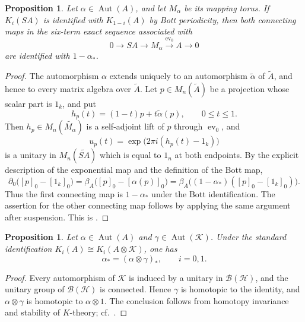 \documentclass{book}
\newtheorem{proposition}[definition]{Proposition}
\begin{document}
\begin{proposition}\label{prop:mapping-torus-connecting-maps}
  Let \(\alpha\in\operatorname{Aut}(A)\), and let \(M_\alpha\) be its mapping
  torus. If \(K_i(SA)\) is identified with \(K_{1-i}(A)\) by Bott periodicity,
  then both connecting maps in the six-term exact sequence associated with
  \[
    0\longrightarrow SA\longrightarrow M_\alpha
    \xrightarrow{\operatorname{ev}_0}A\longrightarrow0
  \]
  are identified with \(1-\alpha_*\).
\end{proposition}
\begin{proof}
  The automorphism \(\alpha\) extends uniquely to an automorphism \(\tilde{\alpha}\) of \(\tilde{A}\), and hence to every
  matrix algebra over \(\tilde{A}\). Let \(p\in M_n(\tilde{A})\) be a projection whose
  scalar part is \(1_k\), and put
  \[
    h_p(t)=(1-t)p+t\tilde{\alpha}(p),\qquad 0\leq t\leq1.
  \]
  Then \(h_p\in M_n(\widetilde{M_\alpha})\) is a self-adjoint lift of \(p\) through
  \(\operatorname{ev}_0\), and
  \[
    u_p(t)=\exp\bigl(2\pi i(h_p(t)-1_k)\bigr)
  \]
  is a unitary in \(M_n(\widetilde{SA})\) which is equal to \(1_n\) at both endpoints.
  By the explicit description of the exponential map and the definition of the
  Bott map,
  \[
    \partial_0\bigl({[p]}_0-{[1_k]}_0\bigr)
    =
    \beta_A\bigl({[p]}_0-{[\alpha(p)]}_0\bigr)
    =
    \beta_A\bigl((1-\alpha_*)({[p]}_0-{[1_k]}_0)\bigr).
  \]
  Thus the first connecting map is \(1-\alpha_*\) under the Bott
  identification. The assertion for the other connecting map follows by
  applying the same argument after suspension. This is
  \cite[Proposition~10.4.1]{Blackadar1998}.
\end{proof}

\begin{proposition}\label{prop:stabilized-automorphism-K-theory}
  Let \(\alpha\in\operatorname{Aut}(A)\) and
  \(\gamma\in\operatorname{Aut}(\mathcal K)\). Under the standard
  identification \(K_i(A)\cong K_i(A\otimes\mathcal K)\), one has
  \[
    \alpha_*=(\alpha\otimes\gamma)_*,\qquad i=0,1.
  \]
\end{proposition}
\begin{proof}
  Every automorphism of \(\mathcal K\) is induced by a unitary in
  \(\mathcal B(\mathcal H)\), and the unitary group of
  \(\mathcal B(\mathcal H)\) is connected. Hence \(\gamma\) is homotopic to
  the identity, and \(\alpha\otimes\gamma\) is homotopic to
  \(\alpha\otimes1\). The conclusion follows from homotopy invariance and
  stability of \(K\)-theory; cf.~\cite[Proposition~10.4.2]{Blackadar1998}.
\end{proof}
\end{document}
